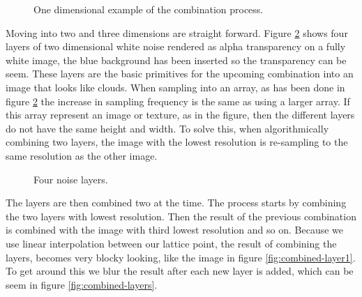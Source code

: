 \begin{figure}[!h]
  \centering
  \subfloat[Layer 0.]{
    \texttt{[image: n0]}
    \label{fig:1d-layer0}
  }
  \hspace{4mm}
  \subfloat[Layer 1.]{
    \texttt{[image: n1]}
    \label{fig:1d-layer1}
  }
  \newline
  \centering
  \subfloat[Layer 2.]{
    \texttt{[image: n2]}
    \label{fig:1d-layer2}
  }
  \hspace{4mm}
  \subfloat[Result.]{
    \texttt{[image: n0to2]}
    \label{fig:1d-result}
  }
  \caption{One dimensional example of the combination process.}
  \label{fig:1d-layers}
\end{figure}

Moving into two and three dimensions are straight forward. Figure
\ref{fig:noise-layers} shows four layers of two dimensional white
noise rendered as alpha transparency on a fully white image, the blue
background has been inserted so the transparency can be seem. These
layers are the basic primitives for the upcoming combination into an
image that looks like clouds.
%
When sampling into an array, as has been done in figure
\ref{fig:noise-layers} the increase in sampling frequency is the same
as using a larger array. If this array represent an image or
texture, as in the figure, then the different layers do not have the
same height and width. To solve this, when algorithmically combining
two layers, the image with the lowest resolution is re-sampling to the
same resolution as the other image.

\begin{figure}[!h]
    \centering
  \hspace{4mm}
  \hspace{4mm}
  \hspace{4mm}
  \caption{Four noise layers.}
  \label{fig:noise-layers}
\end{figure}

The layers are then combined two at the time. The process starts by
combining the two layers with lowest resolution. Then the result of
the previous combination is combined with the image with third lowest
resolution and so on.
%
Because we use linear interpolation between our lattice point, the
result of combining the layers, becomes very blocky looking, like the
image in figure \ref{fig:combined-layer1}. To get
around this we blur the result after each new layer is added, which
can be seem in figure \ref{fig:combined-layers}.

